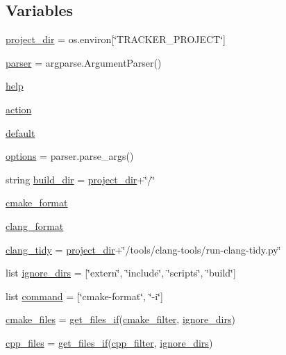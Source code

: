 \subsection*{Variables}
\begin{DoxyCompactItemize}
\item 
\hyperlink{namespaceformat__code_a68ac70ae44b8a44d6bd6287ab8ed3a57}{project\+\_\+dir} = os.\+environ\mbox{[}\char`\"{}T\+R\+A\+C\+K\+E\+R\+\_\+\+P\+R\+O\+J\+E\+CT\char`\"{}\mbox{]}
\item 
\hyperlink{namespaceformat__code_a7f98dd943324417c636055f6fccbbad2}{parser} = argparse.\+Argument\+Parser()
\item 
\hyperlink{namespaceformat__code_abb33d640082c99fb15f9b734df4b4e7f}{help}
\item 
\hyperlink{namespaceformat__code_a0ca88637d05517714f891209306691f8}{action}
\item 
\hyperlink{namespaceformat__code_a97023d650e97528eaf4498d8e9dd74dc}{default}
\item 
\hyperlink{namespaceformat__code_a43a94368c31bf207fd1a26e63b307c08}{options} = parser.\+parse\+\_\+args()
\item 
string \hyperlink{namespaceformat__code_a19bf4f28a88a3baab38d399765075e36}{build\+\_\+dir} = \hyperlink{namespaceformat__code_a68ac70ae44b8a44d6bd6287ab8ed3a57}{project\+\_\+dir}+\char`\"{}/\char`\"{}
\item 
\hyperlink{namespaceformat__code_a60baec6e37117c02aa32ce2f2346e28e}{cmake\+\_\+format}
\item 
\hyperlink{namespaceformat__code_a2064cdd8d02733f15b4d345bbb489a8d}{clang\+\_\+format}
\item 
\hyperlink{namespaceformat__code_af7d6abd2c31bd839896ae3ca08e85449}{clang\+\_\+tidy} = \hyperlink{namespaceformat__code_a68ac70ae44b8a44d6bd6287ab8ed3a57}{project\+\_\+dir}+\char`\"{}/tools/clang-\/tools/run-\/clang-\/tidy.\+py\char`\"{}
\item 
list \hyperlink{namespaceformat__code_a98a7b6be250f74d3192ddcaf0e71dc96}{ignore\+\_\+dirs} = \mbox{[}\char`\"{}extern\char`\"{}, \char`\"{}include\char`\"{}, \char`\"{}scripts\char`\"{}, \char`\"{}build\char`\"{}\mbox{]}
\item 
list \hyperlink{namespaceformat__code_a01fc8c5f5f8fa2a4d063b8ee9d8f9049}{command} = \mbox{[}\char`\"{}cmake-\/format\char`\"{}, \char`\"{}-\/i\char`\"{}\mbox{]}
\item 
\hyperlink{namespaceformat__code_aa9bc31bd1a42202b7c10a668eb8c823a}{cmake\+\_\+files} = \hyperlink{namespaceformat__code_a1e2019dc8ff93d15049c66a4e9c94e63}{get\+\_\+files\+\_\+if}(\hyperlink{namespaceformat__code_ad882a5664cd6e807b139747d74171d6b}{cmake\+\_\+filter}, \hyperlink{namespaceformat__code_a98a7b6be250f74d3192ddcaf0e71dc96}{ignore\+\_\+dirs})
\item 
\hyperlink{namespaceformat__code_ab3774ae8bb3c020b3e7ccd8bba1c6810}{cpp\+\_\+files} = \hyperlink{namespaceformat__code_a1e2019dc8ff93d15049c66a4e9c94e63}{get\+\_\+files\+\_\+if}(\hyperlink{namespaceformat__code_ae832684c35d70292051da5c10b892424}{cpp\+\_\+filter}, \hyperlink{namespaceformat__code_a98a7b6be250f74d3192ddcaf0e71dc96}{ignore\+\_\+dirs})
\end{DoxyCompactItemize}



